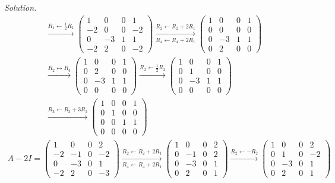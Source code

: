 \documentclass[12pt]{article}
\theoremstyle{definition}
\newenvironment{solution}{\par\noindent\textit{Solution.}\ }{\par\smallskip}
\begin{document}
\begin{solution}
\[\begin{gathered}
\xrightarrow{R_1\leftarrow\frac12R_1}
\begin{pmatrix}1&0&0&1\\-2&0&0&-2\\0&-3&1&1\\-2&2&0&-2\end{pmatrix}
\xrightarrow[R_4\leftarrow R_4+2R_1]{R_2\leftarrow R_2+2R_1}
\begin{pmatrix}1&0&0&1\\0&0&0&0\\0&-3&1&1\\0&2&0&0\end{pmatrix}
\\
\xrightarrow{R_2\leftrightarrow R_4}
\begin{pmatrix}1&0&0&1\\0&2&0&0\\0&-3&1&1\\0&0&0&0\end{pmatrix}
\xrightarrow{R_2\leftarrow\frac12R_2}
\begin{pmatrix}1&0&0&1\\0&1&0&0\\0&-3&1&1\\0&0&0&0\end{pmatrix}
\\
\xrightarrow{R_3\leftarrow R_3+3R_2}
\begin{pmatrix}1&0&0&1\\0&1&0&0\\0&0&1&1\\0&0&0&0\end{pmatrix}
\end{gathered}
\]
\[
\begin{gathered}
A-2I=\begin{pmatrix}1&0&0&2\\-2&-1&0&-2\\0&-3&0&1\\-2&2&0&-3\end{pmatrix}
\xrightarrow[R_4\leftarrow R_4+2R_1]{R_2\leftarrow R_2+2R_1}
\begin{pmatrix}1&0&0&2\\0&-1&0&2\\0&-3&0&1\\0&2&0&1\end{pmatrix}
\xrightarrow{R_2\leftarrow-R_2}
\begin{pmatrix}1&0&0&2\\0&1&0&-2\\0&-3&0&1\\0&2&0&1\end{pmatrix}

\end{gathered}\]
\end{solution}
\end{document}
